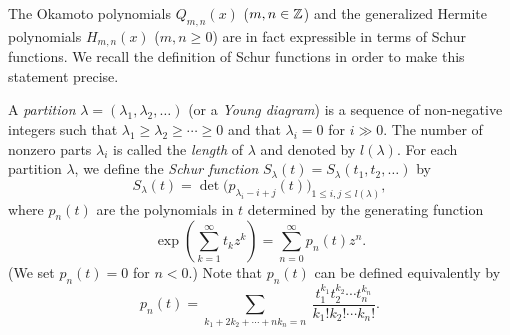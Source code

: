 The Okamoto polynomials $Q_{m,n}(x)$ ($m,n\in{\Bbb Z}$) and 
the generalized Hermite polynomials $H_{m,n}(x)$  ($m,n\ge 0 $) 
are in fact expressible in terms of Schur functions. 
We recall the definition of Schur functions in order to make this statement precise. 
\par\medskip
A {\em partition} $\lambda=(\lambda_1,\lambda_2,\ldots)$ 
(or a {\em Young diagram}) is a sequence of non-negative integers such that 
$\lambda_1 \geq \lambda_2 \geq  \cdots \geq 0$
and that $\lambda_i=0$ for $i\gg 0$.
The number of nonzero parts $\lambda_i$ is called the {\em length} of $\lambda$
and denoted by $l(\lambda)$.
For each partition $\lambda$, we define the {\em Schur function} 
$S_{\lambda}(t)=S_{\lambda}(t_1,t_2,\ldots)$ by 
\begin{equation}
S_{\lambda}(t)=\det \big( p_{\lambda_i-i+j}(t) \big)_{
1 \leq i,j \leq l(\lambda)}, 
\end{equation}
where $p_n(t)$ are the polynomials in $t$ determined by the generating 
function
\begin{equation}
\exp \left(\sum_{k=1}^{\infty} t_k z^k \right)=
\sum_{n=0}^{\infty}p_n(t)z^n. 
\end{equation}
(We set $p_n(t)=0$ for $n<0$.)  
Note that  $p_n(t)$ can be defined equivalently by 
\begin{equation}
p_n(t)={\sum}_{k_1+2k_2+\cdots+n k_n=n} \ 
\frac{t_1^{k_1} t_2^{k_2}\cdots t_n^{k_n}}{k_1! k_2!\cdots k_n !}. 
\end{equation}

